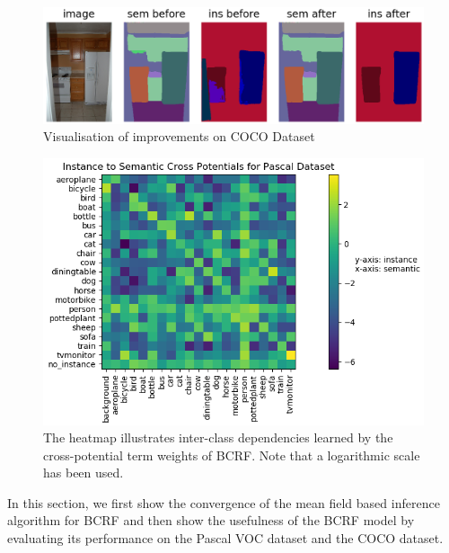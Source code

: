 \begin{figure}[t]
	\begin{center}
		\includegraphics[width=\linewidth]{figs/stuff_vis.png}
	\end{center}
	\vspace{-0.5cm}
	\caption{Visualisation of improvements on COCO Dataset}
	\label{fig:vis}
	\vspace{0.5cm}
\end{figure}


\begin{figure}[t]
	\begin{center}
		\includegraphics[width=0.8\linewidth]{figs/ins_to_sem.png}
	\end{center}
	\vspace{-0.4cm}
	\caption{The heatmap illustrates inter-class dependencies learned by the cross-potential term weights of BCRF. Note that a logarithmic scale has been used. }
	\label{fig:potentials}
	\vspace{0.5cm}
\end{figure}

In this section, we first show the convergence of the mean field based inference algorithm for BCRF and then show the usefulness of the BCRF model by evaluating its performance on the Pascal VOC dataset and the COCO dataset.

